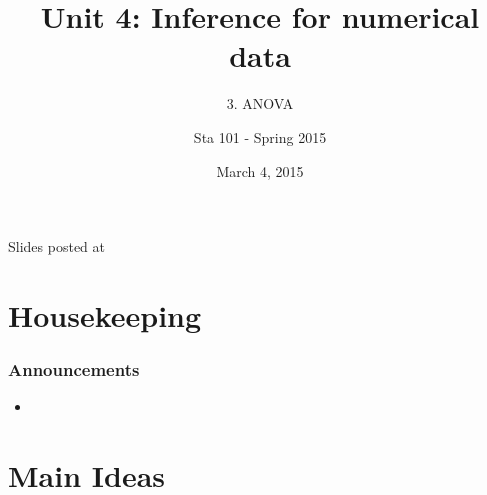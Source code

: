 \documentclass[slidestop,compress,mathserif,12pt,t,professionalfonts,xcolor=table]{beamer}
\title{Unit 4: Inference for numerical data}
\subtitle{3. ANOVA}
\author{Sta 101 - Spring 2015}
\date{March 4, 2015}
\institute{Duke University, Department of Statistical Science}
\newcommand{\bonferroni}{If you want to test many hypotheses simulteneously, use
  the Bonferroni correction.}
\begin{document}


\begin{frame}[plain]

\titlepage
\vfill
{\scriptsize {} \hfill Slides posted at  \webLink{\CourseSite}{\CourseSite}}
\addtocounter{framenumber}{-1} 

\end{frame}


\section{Housekeeping}


\begin{frame}
\frametitle{Announcements}

\begin{itemize}

\item 

\end{itemize}

\end{frame}


\section{Main Ideas}










\end{document}
